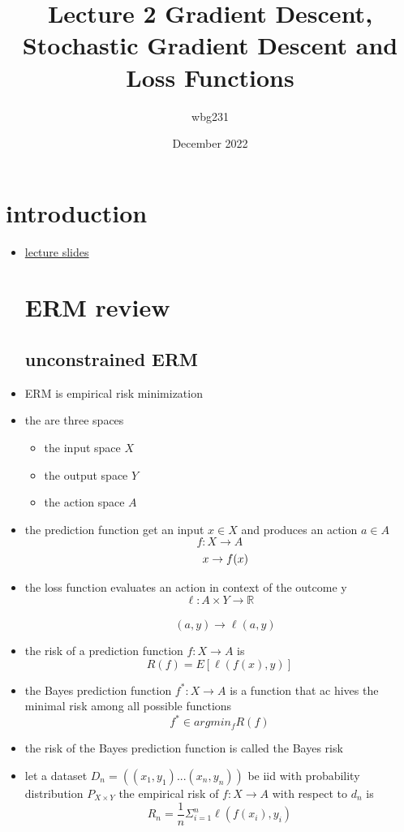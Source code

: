 \documentclass{article}
\title{Lecture 2 Gradient Descent, Stochastic Gradient Descent and Loss Functions}
\author{wbg231 }
\date{December 2022}
\begin{document}
\maketitle

\section{introduction}
\begin{itemize}
\item \href{https://nyu-ds1003.github.io/mlcourse/2023/lectures/lec02/02.pdf}{lecture slides}
\section{ERM review}
\subsection{unconstrained ERM}
\item ERM is empirical risk minimization 
\item the are three spaces 
\begin{itemize}
    \item the input space $X$
    \item the output space $Y$
    \item the action space $A$
\end{itemize}
\item the prediction function get an input $x\in X$ and produces an action $a\in A$ $$f:X\rightarrow A $$ $$\newline \quad x\rightarrow f(x)$$
\item the loss function evaluates an action in context of the outcome y $$\ell:A\times Y\rightarrow \mathbb{R}$$\\ $$\quad (a,y)\rightarrow \ell(a,y)$$
\item the risk of a prediction function $f:X\rightarrow A$ is $$R(f)=E[\ell(f(x),y)]$$
\item the Bayes prediction function $f^*:X\rightarrow A$ is a function that ac hives the minimal risk among all possible functions $$f^{*}\in argmin_{f}R(f)$$
\item the risk of the Bayes prediction function is called the Bayes risk 
\item let a dataset $D_{n}=((x_1,y_1)...(x_n,y_n))$ be iid with probability distribution $P_{X\times Y}$
\imte the empirical risk of $f:X\rightarrow A$ with respect to $d_n$ is $$\hat{R}_{n}=\frac{1}{n}\Sigma_{i=1}^{n}\ell(f(x_i),y_i)$$

\end{itemize}
\end{document}
